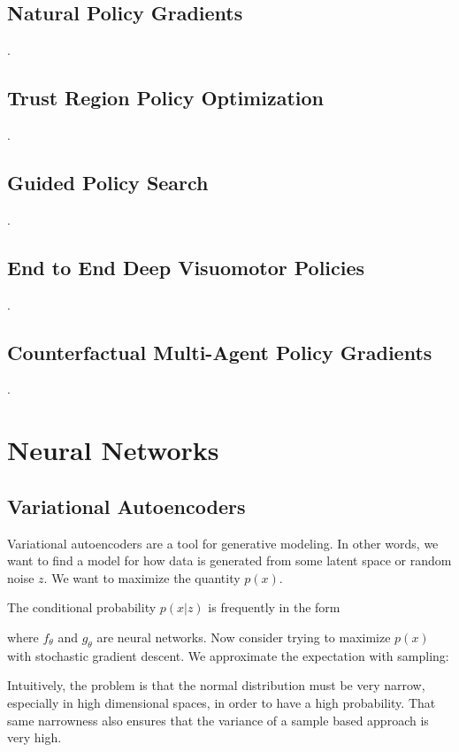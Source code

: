 \documentclass[12pt]{article}
\begin{document}

\subsection{Natural Policy Gradients}
.
\subsection{Trust Region Policy Optimization}
.
\subsection{Guided Policy Search}
.
\subsection{End to End Deep Visuomotor Policies}
.
\subsection{Counterfactual Multi-Agent Policy Gradients}
.
\section{Neural Networks}

\subsection{Variational Autoencoders}

Variational autoencoders are a tool for generative modeling. In other words, we want to find a model for how data is generated from some latent space or random noise $z$. We want to maximize the quantity $p(x)$.


The conditional probability $p(x|z)$ is frequently in the form


where $f_\theta$ and $g_\theta$ are neural networks. Now consider trying to maximize $p(x)$ with stochastic gradient descent. We approximate the expectation with sampling:


Intuitively, the problem is that the normal distribution must be very narrow, especially in high dimensional spaces, in order to have a high probability. That same narrowness also ensures that the variance of a sample based approach is very high.
\end{document}
